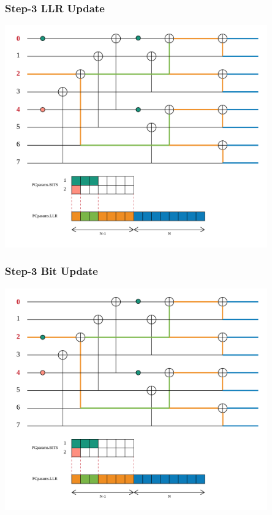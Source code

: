 \documentclass{beamer}
\begin{document}
\begin{frame}
\frametitle{Step-3 LLR Update}
  \begin{center}
  \includegraphics[width=0.85\textwidth]{pics/polar_-_SC_llr_3.png}
  \end{center}
\end{frame}

\begin{frame}
\frametitle{Step-3 Bit Update}
  \begin{center}
  \includegraphics[width=0.85\textwidth]{pics/polar_-_SC_bit_3.png}
  \end{center}
\end{frame}
\end{document}
